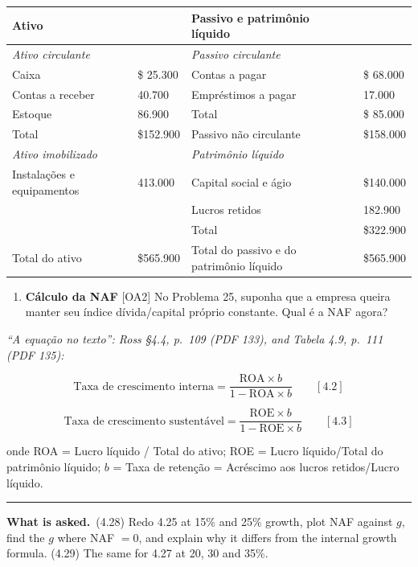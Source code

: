 \documentclass[11pt,a4paper]{article}
\newcommand{\asked}{\par\medskip\noindent\textbf{What is asked.}~}
\providecommand{\tightlist}{\setlength{\itemsep}{0pt}\setlength{\parskip}{0pt}}
\newcommand{\stmtend}{\par\endgroup\nopagebreak\noindent\rule{\linewidth}{0.4pt}\par\medskip}
\begin{document}
{\def\LTcaptype{none} %
\begin{longtable}[]{@{}llll@{}}
\toprule\noalign{}
Ativo & & Passivo e patrimônio líquido & \\
\midrule\noalign{}
\endhead
\bottomrule\noalign{}
\endlastfoot
\emph{Ativo circulante} & & \emph{Passivo circulante} & \\
Caixa & \$ 25.300 & Contas a pagar & \$ 68.000 \\
Contas a receber & 40.700 & Empréstimos a pagar & 17.000 \\
Estoque & 86.900 & Total & \$ 85.000 \\
Total & \$152.900 & Passivo não circulante & \$158.000 \\
\emph{Ativo imobilizado} & & \emph{Patrimônio líquido} & \\
Instalações e equipamentos & 413.000 & Capital social e ágio & \$140.000 \\
& & Lucros retidos & 182.900 \\
& & Total & \$322.900 \\
Total do ativo & \$565.900 & Total do passivo e do patrimônio líquido & \$565.900 \\
\end{longtable}
}

\begin{enumerate}
\def\labelenumi{\arabic{enumi}.}
\setcounter{enumi}{26}
\tightlist
\item
  \textbf{Cálculo da NAF} {[}OA2{]} No Problema 25, suponha que a empresa queira manter seu índice
  dívida/capital próprio constante. Qual é a NAF agora?
\end{enumerate}

\emph{``A equação no texto'': Ross §4.4, p.~109 (PDF 133), and Tabela 4.9, p.~111 (PDF 135):}

\[\text{Taxa de crescimento interna} = \frac{\text{ROA} \times b}{1 - \text{ROA} \times b} \qquad [4.2]\]

\[\text{Taxa de crescimento sustentável} = \frac{\text{ROE} \times b}{1 - \text{ROE} \times b} \qquad [4.3]\]

onde ROA = Lucro líquido / Total do ativo; ROE = Lucro líquido/Total do patrimônio líquido; \(b\) =
Taxa de retenção = Acréscimo aos lucros retidos/Lucro líquido.
\stmtend

\asked (4.28) Redo 4.25 at 15\% and 25\% growth, plot NAF against $g$, find the $g$ where NAF $=0$, and
explain why it differs from the internal growth formula. (4.29) The same for 4.27 at 20, 30 and 35\%.
\end{document}
